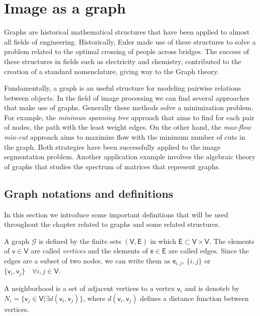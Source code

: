 \section{Image as a graph}

Graphs are historical mathematical structures that have been applied to almost all fields of engineering. Historically, Euler made use of these structures to solve a problem related to the optimal crossing of people across bridges. The success of these structures in fields such as electricity and chemistry, contributed to the creation of a standard nomenclature, giving way to the Graph theory.

Fundamentally, a graph is an useful structure for modeling pairwise relations between objects. In the field of image processing we can find several approaches that make use of graphs. Generally these methods solve a minimization problem. For example, the \textit{minimun spanning tree} approach that aims to find for each pair of nodes, the path with the least weight edges. On the other hand, the \textit{max-flow min-cut} approach aims to maximize flow with the minimum number of cuts in the graph. Both strategies have been successfully applied to the image segmentation problem. Another application example involves the algebraic theory of graphs that studies the spectrum of matrices that represent graphs.



\subsection{Graph notations and definitions}

In this section we introduce some important definitions that will be used throughout the chapter related to graphs and some related structures.

\theoremstyle{definition}
\begin{definition}[Graph]
	A graph $\mathcal{G}$ is defined by the finite sets $(\mathsf{V}, \mathsf{E})$ in which $\mathsf{E} \subset \mathsf{V} \times \mathsf{V}$. The elements of $\mathsf{v} \in \mathsf{V}$ are called \textit{vertices} and the elements of $\mathsf{e} \in \mathsf{E}$ are called edges. Since the edges are a subset of two nodes, we can write them as $\mathsf{e}_{i,j}$, $\{i, j\}$ or $\{\mathsf{v}_{i}, \mathsf{v}_{j}\} \quad \forall i, j \in \mathsf{V}$.
\end{definition}

\begin{definition}[Neighborhood]
	A neighborhood is a set of adjacent vertices to a vertex $\mathsf{v}_i$ and is denoteb by $N_i = \{\mathsf{v}_j \in \mathsf{V}  | \exists d(\mathsf{v}_i, \mathsf{v}_j)\}$, where $d(\mathsf{v}_i, \mathsf{v}_j)$ defines a distance function between vertices.
\end{definition}

